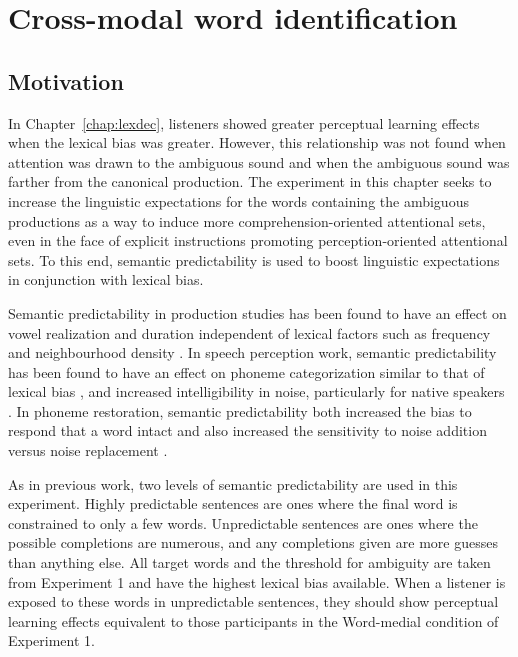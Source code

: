 
\chapter{Cross-modal word identification}
\label{chap:sent}


\section{Motivation}

In Chapter~\ref{chap:lexdec}, listeners showed greater perceptual learning effects when the lexical bias was greater.  
However, this relationship was not found when attention was drawn to the ambiguous sound and when the ambiguous sound was farther from the canonical production.  
The experiment in this chapter seeks to increase the linguistic expectations for the words containing the ambiguous productions as a way to induce more comprehension-oriented attentional sets, even in the face of explicit instructions promoting perception-oriented attentional sets.  
To this end, semantic predictability is used to boost linguistic expectations in conjunction with lexical bias.

Semantic predictability in production studies has been found to have an effect on vowel realization and duration independent of lexical factors such as frequency and neighbourhood density \citep{Scarborough2010, Clopper2008}.  
In speech perception work, semantic predictability has been found to have an effect on phoneme categorization similar to that of lexical bias \citep{Borsky1998}, and increased intelligibility in noise, particularly for native speakers \citep[and others]{Kalikow1977, Mayo1997, Fallon2002, Bradlow2007}.
In phoneme restoration, semantic predictability both increased the bias to respond that a word intact and also increased the sensitivity to noise addition versus noise replacement \citep{Samuel1981}.

As in previous work, two levels of semantic predictability are used in this experiment.  
Highly predictable sentences are ones where the final word is constrained to only a few words.  
Unpredictable sentences are ones where the possible completions are numerous, and any completions given are more guesses than anything else.
All target words and the threshold for ambiguity are taken from Experiment 1 and have the highest lexical bias available.
When a listener is exposed to these words in unpredictable sentences, they should show perceptual learning effects equivalent to those participants in the Word-medial condition of Experiment 1.

